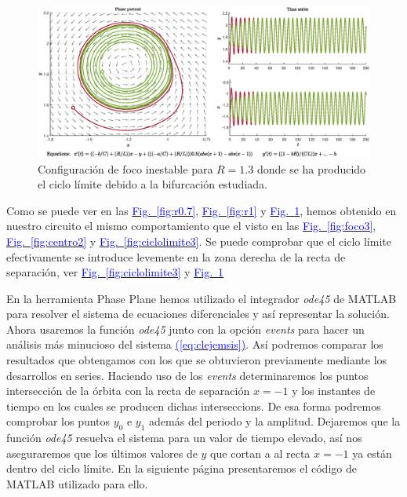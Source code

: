 \documentclass[12pt,a4paper]{report} %
\newcommand{\fref}[1]{\hyperref[#1]{\textcolor{blue}{Fig.~\ref*{#1}}}}
\newcommand{\eref}[1]{\hyperref[#1]{\textcolor{blue}{(\ref*{#1})}}}
\newcommand{\fref}[1]{\hyperref[#1]{\textcolor{blue}{\textit{Fig.~\ref*{#1}}}}}
\newcommand{\eref}[1]{\hyperref[#1]{\textcolor{blue}{\textit{(\ref*{#1})}}}}
\begin{document}
	\newpage
	
	\begin{figure}[h]
		\centering
		\includegraphics[width=1\textwidth]{r1.3.eps}
		\caption{Configuración de foco inestable para $R=1.3$ donde se ha producido el ciclo límite debido a la bifurcación estudiada.}
		\label{fig:r1.3}
	\end{figure}\smallskip
	
	Como se puede ver en las \fref{fig:r0.7}, \fref{fig:r1} y \fref{fig:r1.3}, hemos obtenido en nuestro circuito el mismo comportamiento que el visto en las \fref{fig:foco3}, \fref{fig:centro2} y \fref{fig:ciclolimite3}. Se puede comprobar que el ciclo límite efectivamente se introduce levemente en la zona derecha de la recta de separación, ver \fref{fig:ciclolimite3} y \fref{fig:r1.3}
	
	\vspace{0.5cm} En la herramienta Phase Plane hemos utilizado el integrador \textit{ode45} de MATLAB para resolver el sistema de ecuaciones diferenciales y así representar la solución. Ahora usaremos la función \textit{ode45} junto con la opción \textit{events} para hacer un análisis más minucioso del sistema \eref{eq:clejemsis}. Así podremos comparar los resultados que obtengamos con los que se obtuvieron previamente mediante los desarrollos en series. Haciendo uso de los \textit{events} determinaremos los puntos intersección de la órbita con la recta de separación $x=-1$ y los instantes de tiempo en los cuales se producen dichas interseccions. De esa forma podremos comprobar los puntos $y_0$ e $y_1$ además del periodo y la amplitud. Dejaremos que la función \textit{ode45} resuelva el sistema para un valor de tiempo elevado, así nos aseguraremos que los últimos valores de $y$ que cortan a al recta $x=-1$ ya están dentro del ciclo límite. En la siguiente página presentaremos el código de MATLAB utilizado para ello.
	
	\newpage
	
\end{document}
